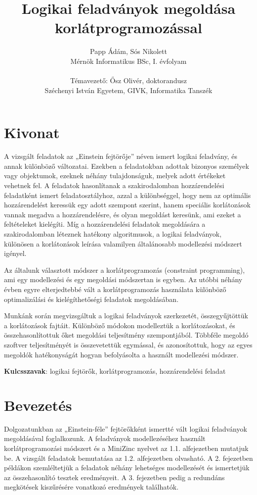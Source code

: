 \documentclass[12pt,a4paper]{report}
\author{Papp Ádám, Sós Nikolett\\Mérnök Informatikus BSc, I. évfolyam\\\ \\Témavezető: Ősz Olivér, doktorandusz\\Széchenyi István Egyetem, GIVK, Informatika Tanszék}
\title{Logikai feladványok megoldása \\korlátprogramozással}
\begin{document}
\maketitle


\chapter*{Kivonat}

    A vizsgált feladatok az „Einstein fejtörője” néven ismert logikai feladvány, és annak különböző változatai.
    Ezekben a feladatokban adottak bizonyos személyek vagy objektumok, ezeknek néhány tulajdonságuk, melyek adott értékeket vehetnek fel.
    A feladatok hasonlítanak a szakirodalomban hozzárendelési feladatként ismert feladatosztályhoz, azzal a különbséggel, hogy nem az optimális hozzárendelést keressük egy adott szempont szerint, hanem speciális korlátozások vannak megadva a hozzárendelésre, és olyan megoldást keresünk, ami ezeket a feltételeket kielégíti.
    Míg a hozzárendelési feladatok megoldására a szakirodalomban léteznek hatékony algoritmusok, a logikai feladványok, különösen a korlátozások leírása valamilyen általánosabb modellezési módszert igényel.

    Az általunk választott módszer a korlátprogramozás (constraint programming), ami egy modellezési és egy megoldási módszertan is egyben.
    Az utóbbi néhány évben egyre elterjedtebbé vált a korlátprogramozás használata különböző optimalizálási és kielégíthetőségi feladatok megoldásában.

    Munkánk során megvizsgáltuk a logikai feladványok szerkezetét, összegyűjtöttük a korlátozások fajtáit.
    Különböző módokon modelleztük a korlátozásokat, és összehasonlítottuk őket megoldási teljesítmény szempontjából.
    Többféle megoldó szoftver teljesítményét is összevetettük egymással, és azonosítottuk, hogy az egyes megoldók hatékonyságát hogyan befolyásolta a használt modellezési módszer.

    \textbf{Kulcsszavak}: logikai fejtörők, korlátprogramozás, hozzárendelési feladat


\tableofcontents


\chapter{Bevezetés}

    Dolgozatunkban az „Einstein-féle” fejtörőkként ismertté vált logikai feladványok megoldásával foglalkozunk.
    A feladványok modellezéséhez használt korlátprogramozási módszert és a MiniZinc nyelvet az 1.1. alfejezetben mutatjuk be.
    A vizsgált feladatok bemutatása az 1.2. alfejezetben olvasható.
    A 2. fejezetben példákon szemléltetjük a feladatok néhány lehetséges modellezését és ismertetjük az összehasonlító tesztek eredményeit.
    A 3. fejezetben pedig a redundáns megkötések kiszűrésére vonatkozó eredmények találhatók.
\end{document}
